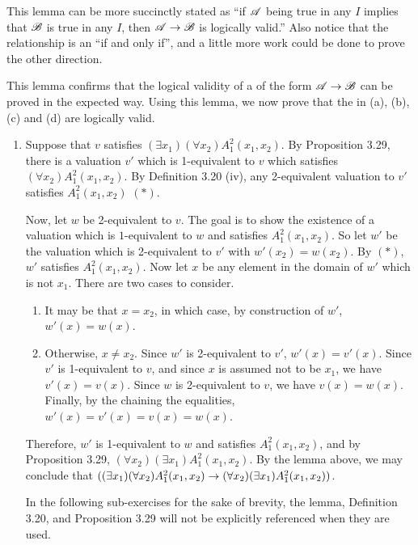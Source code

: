 \begin{enumerate}
\begin{lemma*}
      \note{} This lemma can be more succinctly stated as ``if \(\mathscr{A}\) being true in any \(I\) implies that \(\mathscr{B}\) is true in any \(I\), then \(\mathscr{A} \rightarrow \mathscr{B}\) is logically valid.'' Also notice that the relationship is an ``if and only if'', and a little more work could be done to prove the other direction.
    \end{lemma*}

    This lemma confirms that the logical validity of a \wf{} of the form \(\mathscr{A} \rightarrow \mathscr{B}\) can be proved in the expected way. Using this lemma, we now prove that the \wfs{} in (a), (b), (c) and (d) are logically valid.
    \begin{enumerate}[align=left]
      \item Suppose that \(v\) satisfies \((\exists x_1)(\forall x_2)A^2_1(x_1, x_2)\). By Proposition 3.29, there is a valuation \(v'\) which is 1-equivalent to \(v\) which satisfies \((\forall x_2)A^2_1(x_1, x_2)\). By Definition 3.20 (iv), any 2-equivalent valuation to \(v'\) satisfies \(A^2_1(x_1, x_2)\) \((\ast)\).

      Now, let \(w\) be 2-equivalent to \(v\). The goal is to show the existence of a valuation which is \(1\)-equivalent to \(w\) and satisfies \(A^2_1(x_1, x_2)\). So let \(w'\) be the valuation which is 2-equivalent to \(v'\) with \(w'(x_2) = w(x_2)\). By \((\ast)\), \(w'\) satisfies \(A^2_1(x_1, x_2)\). Now let \(x\) be any element in the domain of \(w'\) which is not \(x_1\). There are two cases to consider. 
      \begin{enumerate}
        \item It may be that \(x = x_2\), in which case, by construction of \(w'\), \(w'(x) = w(x)\).
        \item Otherwise, \(x \neq x_2\). Since \(w'\) is 2-equivalent to \(v'\), \(w'(x) = v'(x)\). Since \(v'\) is 1-equivalent to \(v\), and since \(x\) is assumed not to be \(x_1\), we have \(v'(x) = v(x)\). Since \(w\) is 2-equivalent to \(v\), we have \(v(x) = w(x)\). Finally, by the chaining the equalities, \(w'(x) = v'(x) = v(x) = w(x)\).
      \end{enumerate}
      Therefore, \(w'\) is 1-equivalent to \(w\) and satisfies \(A^2_1(x_1, x_2)\), and by Proposition 3.29, \((\forall x_2)(\exists x_1)A^2_1(x_1, x_2)\). By the lemma above, we may conclude that \(((\exists x_1)(\forall x_2)A^2_1(x_1, x_2) \rightarrow (\forall x_2)(\exists x_1)A^2_1(x_1, x_2))\).

      \note{} In the following sub-exercises for the sake of brevity, the lemma, Definition 3.20, and Proposition 3.29 will not be explicitly referenced when they are used.


\end{enumerate}
\end{enumerate}
